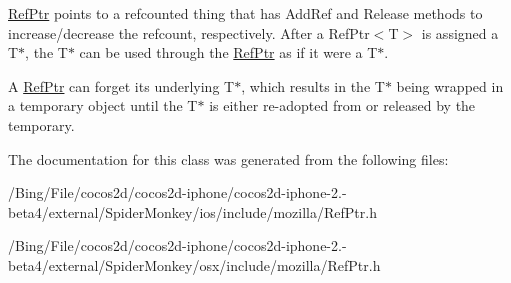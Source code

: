 \hyperlink{classmozilla_1_1_ref_ptr}{Ref\-Ptr} points to a refcounted thing that has Add\-Ref and Release methods to increase/decrease the refcount, respectively. After a Ref\-Ptr$<$\-T$>$ is assigned a T$\ast$, the T$\ast$ can be used through the \hyperlink{classmozilla_1_1_ref_ptr}{Ref\-Ptr} as if it were a T$\ast$.

A \hyperlink{classmozilla_1_1_ref_ptr}{Ref\-Ptr} can forget its underlying T$\ast$, which results in the T$\ast$ being wrapped in a temporary object until the T$\ast$ is either re-\/adopted from or released by the temporary. 

The documentation for this class was generated from the following files\-:\begin{DoxyCompactItemize}
\item 
/\-Bing/\-File/cocos2d/cocos2d-\/iphone/cocos2d-\/iphone-\/2.-\/beta4/external/\-Spider\-Monkey/ios/include/mozilla/Ref\-Ptr.\-h\item 
/\-Bing/\-File/cocos2d/cocos2d-\/iphone/cocos2d-\/iphone-\/2.-\/beta4/external/\-Spider\-Monkey/osx/include/mozilla/Ref\-Ptr.\-h\end{DoxyCompactItemize}
